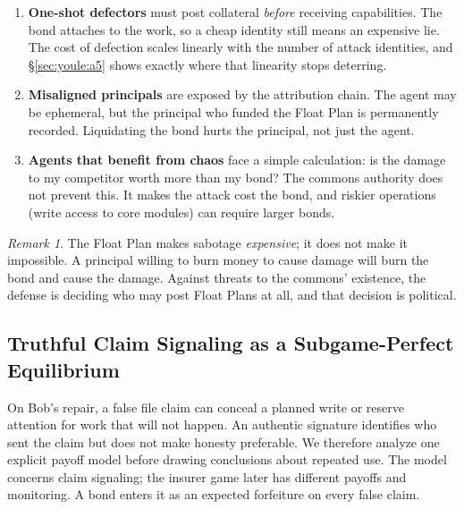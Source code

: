 \documentclass[11pt,a4paper]{article}
\theoremstyle{definition}
\theoremstyle{remark}
\newtheorem*{remark}{Remark}
\begin{document}
\begin{enumerate}
  \item \textbf{One-shot defectors} must post collateral \emph{before} receiving capabilities. The bond attaches to the work, so a cheap identity still means an expensive lie. The cost of defection scales linearly with the number of attack identities, and \S\ref{sec:youle:a5} shows exactly where that linearity stops deterring.

  \item \textbf{Misaligned principals} are exposed by the attribution chain. The agent may be ephemeral, but the principal who funded the Float Plan is permanently recorded. Liquidating the bond hurts the principal, not just the agent.

  \item \textbf{Agents that benefit from chaos} face a simple calculation: is the damage to my competitor worth more than my bond? The commons authority does not prevent this. It makes the attack cost the bond, and riskier operations (write access to core modules) can require larger bonds.
\end{enumerate}

\begin{remark}
The Float Plan makes sabotage \emph{expensive}; it does not make it impossible. A principal willing to burn money to cause damage will burn the bond and cause the damage. Against threats to the commons' existence, the defense is deciding who may post Float Plans at all, and that decision is political.
\end{remark}

\subsection{Truthful Claim Signaling as a Subgame-Perfect Equilibrium}\label{sec:claim-signaling-ic}

On Bob's repair, a false file claim can conceal a planned write or reserve
attention for work that will not happen. An authentic signature identifies
who sent the claim but does not make honesty preferable. We therefore analyze
one explicit payoff model before drawing conclusions about repeated use.
The model concerns claim signaling; the insurer game later has different
payoffs and monitoring. A bond enters it as an expected forfeiture on every
false claim.

\pagebreak
\end{document}

